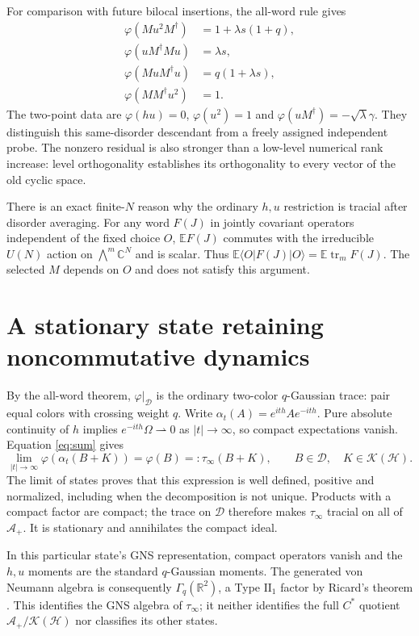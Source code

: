 \documentclass[11pt]{article}
\newcommand{\HH}{\mathcal H}
\newcommand{\Alg}{\mathcal A}
\newcommand{\K}{\mathcal K(\HH)}
\newcommand{\E}{\mathbb E}
\begin{document}
For comparison with future bilocal insertions, the all-word rule gives
\begin{align}
 \varphi(Mu^2M^\dagger)&=1+\lambda s(1+q),\\
 \varphi(uM^\dagger Mu)&=\lambda s,\\
 \varphi(MuM^\dagger u)&=q(1+\lambda s),\\
 \varphi(MM^\dagger u^2)&=1.
\end{align}
The two-point data are $\varphi(hu)=0$, $\varphi(u^2)=1$ and
$\varphi(uM^\dagger)=-\sqrt\lambda\gamma$. They distinguish this
same-disorder descendant from a freely assigned independent probe.
The nonzero residual is also stronger than a low-level numerical rank
increase: level orthogonality establishes its orthogonality to every
vector of the old cyclic space.

There is an exact finite-$N$ reason why the ordinary $h,u$ restriction
is tracial after disorder averaging. For any word $F(J)$ in jointly
covariant operators independent of the fixed choice $O$,
$\E F(J)$ commutes with the irreducible $U(N)$ action on
$\bigwedge^m\mathbb C^N$ and is scalar. Thus
$\E\langle O|F(J)|O\rangle=\E\operatorname{tr}_m F(J)$.
The selected $M$ depends on $O$ and does not satisfy this argument.

\newpage
\section{A stationary state retaining noncommutative dynamics}
By the all-word theorem, $\varphi|_{\mathcal D}$ is the ordinary
two-color $q$-Gaussian trace: pair equal colors with crossing weight
$q$. Write $\alpha_t(A)=e^{ith}Ae^{-ith}$. Pure absolute continuity
of $h$ implies $e^{-ith}\Omega\rightharpoonup0$ as $|t|\to\infty$,
so compact expectations vanish. Equation \eqref{eq:sum} gives
\begin{equation}\label{eq:state}
 \lim_{|t|\to\infty}\varphi(\alpha_t(B+K))
    =\varphi(B)=:\tau_\infty(B+K),
 \qquad B\in\mathcal D,\quad K\in\K.
\end{equation}
The limit of states proves that this expression is well defined,
positive and normalized, including when the decomposition is not
unique. Products with a compact factor are compact; the trace on
$\mathcal D$ therefore makes $\tau_\infty$ tracial on all of
$\Alg_+$. It is stationary and annihilates the compact ideal.

In this particular state's GNS representation, compact operators
vanish and the $h,u$ moments are the standard $q$-Gaussian moments.
The generated von Neumann algebra is consequently
$\Gamma_q(\mathbb R^2)$, a Type $\mathrm{II}_1$ factor by
Ricard's theorem \cite{Ricard}. This identifies the GNS algebra of
$\tau_\infty$; it neither identifies the full $C^*$ quotient
$\Alg_+/\K$ nor classifies its other states.
\end{document}
